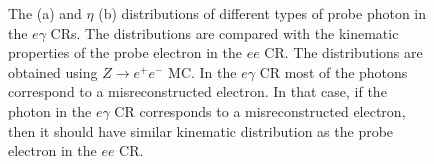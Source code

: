 \begin{figure}[!htbp]
\centering
{}
	\caption [] {The \pt (a) and $\eta$ (b) distributions of different types of probe photon in the $e\gamma$ CRs. The distributions are compared with the kinematic properties of the probe electron in the $ee$ CR. The distributions are obtained using $Z\rightarrow e^+e^-$ MC. In the $e\gamma$ CR most of the photons correspond to a misreconstructed electron. In that case, if the photon in the $e\gamma$ CR corresponds to a misreconstructed electron, then it should have similar kinematic distribution as the probe electron in the $ee$ CR.}
\label{fig:egammafake_probepteta}
\end{figure}   


